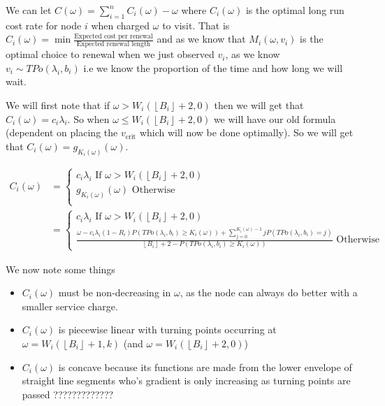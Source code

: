 \documentclass[a4paper,10pt]{article}
\newcommand{\floor}[1]{\left \lfloor #1 \right \rfloor}
\theoremstyle{definition}
\theoremstyle{definition}
\theoremstyle{remark}
\theoremstyle{definition}
\begin{document}
We can let $C(\omega)=\sum\limits_{i=1}^{n} C_{i}(\omega) -\omega$ where $C_{i}(\omega)$ is the optimal long run cost rate for node $i$ when charged $\omega$ to visit. That is $C_{i}(\omega)=\min \frac{\text{Expected cost per renewal}}{\text{Expected renewal length}}$ and as we know that $M_{i}(\omega,v_{i})$ is the optimal choice to renewal when we just observed $v_{i}$, as we know $v_{i} \sim TPo(\lambda_{i},b_{i})$ i.e we know the proportion of the time and how long we will wait.

We will first note that if $\omega > W_{i}(\floor{B_{i}}+2,0)$ then we will get that $C_{i}(\omega)= c_{i} \lambda_{i}$. So when $\omega \leq W_{i}(\floor{B_{i}}+2,0)$ we will have our old formula (dependent on placing the $v_{\text{crit}}$ which will now be done optimally). So we will get that $C_{i}(\omega)=g_{K_{i}(\omega)}(\omega)$.

\begin{align}
C_{i}(\omega)&=\begin{cases}
c_{i} \lambda_{i} \text{ If } \omega > W_{i}(\floor{B_{i}}+2,0) \\
g_{K_{i}(\omega)}(\omega) \text{ Otherwise} \\ 
\end{cases} \\
&= \begin{cases}
c_{i} \lambda_{i} \text{ If } \omega > W_{i}(\floor{B_{i}}+2,0) \\
\frac{\omega - c_{i} \lambda_{i} (1-R_{i}) P(TPo(\lambda_{i},b_{i}) \geq K_{i}(\omega)) +  \sum\limits_{j=0}^{K_{i}(\omega)-1} j P(TPo(\lambda_{i},b_{i})=j)}{\floor{B_{i}}+2-P(TPo(\lambda_{i},b_{i}) \geq K_{i}(\omega))} \text{ Otherwise}
\end{cases}
\end{align}

We now note some things

\begin{itemize}
\item $C_{i}(\omega)$ must be non-decreasing in $\omega$, as the node can always do better with a smaller service charge.

\item $C_{i}(\omega)$ is piecewise linear with turning points occurring at $\omega=W_{i}(\floor{B_{i}}+1,k)$ (and $\omega=W_{i}(\floor{B_{i}}+2,0)$)

\item $C_{i}(\omega)$ is concave because its functions are made from the lower envelope of straight line segments who's gradient is only increasing as turning points are passed ?????????????
\end{itemize}
\end{document}
